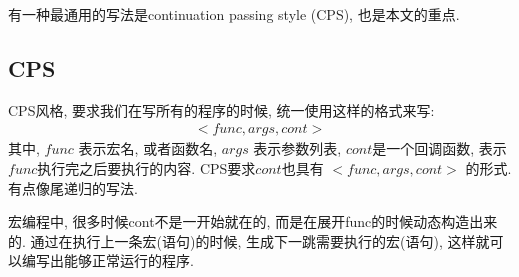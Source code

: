 \documentclass{article}
\begin{document}
有一种最通用的写法是continuation passing style (CPS), 也是本文的重点.
\subsection{CPS}
CPS风格, 要求我们在写所有的程序的时候, 统一使用这样的格式来写:
\begin{align*}
  <func, args, cont>
\end{align*}
其中, $func$ 表示宏名, 或者函数名, $args$ 表示参数列表, $cont$是一个回调函数, 表示$func$执行完之后要执行的内容.
CPS要求$cont$也具有 $<func, args, cont>$ 的形式.
有点像尾递归的写法.

宏编程中, 很多时候cont不是一开始就在的, 而是在展开func的时候动态构造出来的.
通过在执行上一条宏(语句)的时候, 生成下一跳需要执行的宏(语句), 这样就可以编写出能够正常运行的程序.
\end{document}
